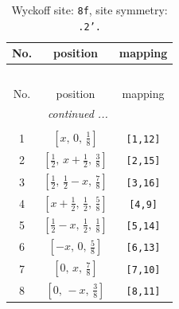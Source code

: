 \documentclass[fleqn,8pt]{jsarticle}
\begin{document}
\begin{longtable}{ccc}
\caption{Wyckoff site: {\tt 8f}, site symmetry: {\tt .2'.}}
 \\
 \hline \hline
No. & position & mapping \\ \hline \endfirsthead

\multicolumn{2}{l}{\tablename\ \thetable{}} \\
 \hline \hline
No. & position & mapping \\ \hline \endhead

 \hline \hline
\multicolumn{2}{r}{\footnotesize\it continued ...} \\ \endfoot

 \hline \hline
\multicolumn{2}{r}{} \\ \endlastfoot

1 & $\left[ x,\, 0,\, \frac{1}{8} \right]$ & {\tt [1,12]} \\ \hline
2 & $\left[ \frac{1}{2},\, x + \frac{1}{2},\, \frac{3}{8} \right]$ & {\tt [2,15]} \\ \hline
3 & $\left[ \frac{1}{2},\, \frac{1}{2} - x,\, \frac{7}{8} \right]$ & {\tt [3,16]} \\ \hline
4 & $\left[ x + \frac{1}{2},\, \frac{1}{2},\, \frac{5}{8} \right]$ & {\tt [4,9]} \\ \hline
5 & $\left[ \frac{1}{2} - x,\, \frac{1}{2},\, \frac{1}{8} \right]$ & {\tt [5,14]} \\ \hline
6 & $\left[ - x,\, 0,\, \frac{5}{8} \right]$ & {\tt [6,13]} \\ \hline
7 & $\left[ 0,\, x,\, \frac{7}{8} \right]$ & {\tt [7,10]} \\ \hline
8 & $\left[ 0,\, - x,\, \frac{3}{8} \right]$ & {\tt [8,11]} \\
\end{longtable}
\renewcommand{\arraystretch}{1.2}
\end{document}
